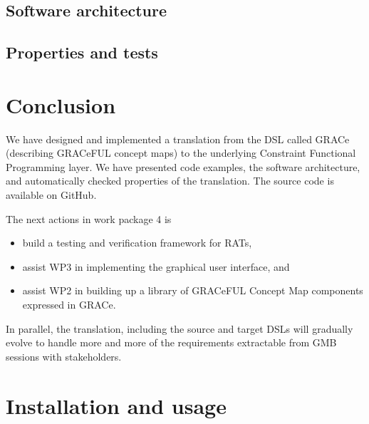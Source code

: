 \documentclass{article}
\begin{document}
\subsection{Software architecture}

\subsection{Properties and tests}

\section{Conclusion}

We have designed and implemented a translation from the DSL called
GRACe (describing GRACeFUL concept maps) to the underlying Constraint
Functional Programming layer.
%
We have presented code examples, the software architecture, and
automatically checked properties of the translation.
%
The source code is available on GitHub.

The next actions in work package 4 is
\begin{itemize}
\item build a testing and verification framework for RATs,
\item assist WP3 in implementing the graphical user interface, and
\item assist WP2 in building up a library of GRACeFUL Concept Map
  components expressed in GRACe.
\end{itemize}
%
In parallel, the translation, including the source and target DSLs
will gradually evolve to handle more and more of the requirements
extractable from GMB sessions with stakeholders.


\appendix
\section{Installation and usage}




\end{document}
